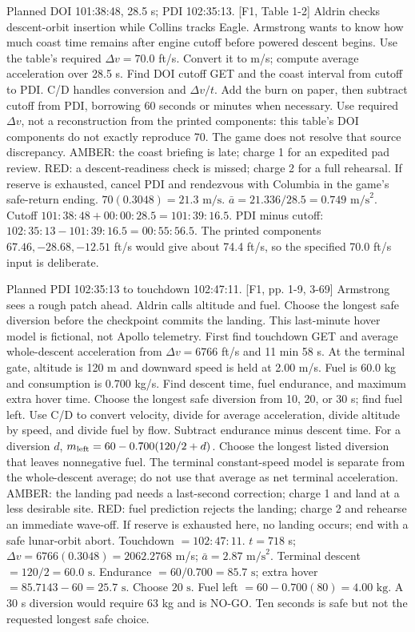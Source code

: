{Planned DOI 101:38:48, 28.5 s; PDI 102:35:13. [F1, Table 1-2]}
{Aldrin checks descent-orbit insertion while Collins tracks Eagle.
Armstrong wants to know how much coast time remains after engine cutoff
before powered descent begins.}
{Use the table's required \(\Delta v=70.0\) ft/s.
Convert it to m/s; compute average acceleration over 28.5 s.
Find DOI cutoff GET and the coast interval from cutoff to PDI.}
{C/D handles conversion and \(\Delta v/t\).
Add the burn on paper, then subtract cutoff from PDI, borrowing
60 seconds or minutes when necessary.}
{Use required \(\Delta v\), not a reconstruction from the printed
components: this table's DOI components do not exactly reproduce 70.
The game does not resolve that source discrepancy.}
{AMBER: the coast briefing is late; charge 1 for an expedited pad
review. RED: a descent-readiness check is missed; charge 2 for a
full rehearsal. If reserve is exhausted, cancel PDI and rendezvous
with Columbia in the game's safe-return ending.}
{\(70(0.3048)=\boxed{21.3\text{ m/s}}\).
\(\bar a=21.336/28.5=\boxed{0.749\text{ m/s}^2}\).
Cutoff \(101{:}38{:}48+00{:}00{:}28.5
=\boxed{101{:}39{:}16.5}\).
PDI minus cutoff:
\(102{:}35{:}13-101{:}39{:}16.5
=\boxed{00{:}55{:}56.5}\).
The printed components \(67.46,-28.68,-12.51\) ft/s would give about
74.4 ft/s, so the specified 70.0 ft/s input is deliberate.}

{Planned PDI 102:35:13 to touchdown 102:47:11. [F1, pp. 1-9, 3-69]}
{Armstrong sees a rough patch ahead. Aldrin calls altitude and fuel.
Choose the longest safe diversion before the checkpoint commits the
landing. This last-minute hover model is fictional, not Apollo telemetry.}
{First find touchdown GET and average whole-descent acceleration from
\(\Delta v=6766\) ft/s and 11 min 58 s.
At the terminal gate, altitude is 120 m and downward speed is held at
2.00 m/s. Fuel is 60.0 kg and consumption is 0.700 kg/s.
Find descent time, fuel endurance, and maximum extra hover time.
Choose the longest safe diversion from 10, 20, or 30 s; find fuel left.}
{Use C/D to convert velocity, divide for average acceleration,
divide altitude by speed, and divide fuel by flow.
Subtract endurance minus descent time. For a diversion \(d\),
\(m_{\rm left}=60-0.700(120/2+d)\).}
{Choose the longest listed diversion that leaves nonnegative fuel.
The terminal constant-speed model is separate from the whole-descent
average; do not use that average as net terminal acceleration.}
{AMBER: the landing pad needs a last-second correction; charge 1 and
land at a less desirable site. RED: fuel prediction rejects the
landing; charge 2 and rehearse an immediate wave-off. If reserve is
exhausted here, no landing occurs; end with a safe lunar-orbit abort.}
{Touchdown \(=\boxed{102{:}47{:}11}\).
\(t=718\) s; \(\Delta v=6766(0.3048)=2062.2768\) m/s;
\(\bar a=\boxed{2.87\text{ m/s}^2}\).
Terminal descent \(=120/2=\boxed{60.0\text{ s}}\).
Endurance \(=60/0.700=\boxed{85.7\text{ s}}\);
extra hover \(=85.7143-60=\boxed{25.7\text{ s}}\).
Choose \(\boxed{20\text{ s}}\).
Fuel left \(=60-0.700(80)=\boxed{4.00\text{ kg}}\).
A 30 s diversion would require 63 kg and is NO-GO.
Ten seconds is safe but not the requested longest safe choice.}

